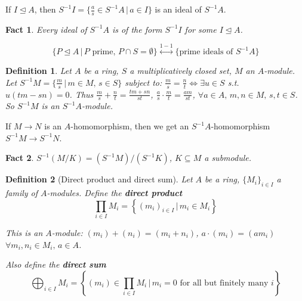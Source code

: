 \documentclass[a4paper]{article}
\newtheorem*{definition}{Definition}
\newtheorem*{fact}{Fact}
\begin{document}
If $I \trianglelefteq A$, then $S^{-1}I = \{\frac{a}{s}\in S^{-1}A \,|\, a \in I\}$ is an ideal of $S^{-1}A$.

\begin{fact}
	Every ideal of $S^{-1}A$ is of the form $S^{-1}I$ for some $I \trianglelefteq A$.
	
	$$\{P \trianglelefteq A \,|\, P \text{ prime, } P \cap S = \emptyset\} \overset{1-1}{\longleftrightarrow} \{\text{prime ideals of } S^{-1}A\}$$
\end{fact}

\begin{definition}
	Let $A$ be a ring, $S$ a multiplicatively closed set, $M$ an $A$-module. Let $S^{-1}M = \{\frac{m}{s} \,|\, m\in M,\, s\in S\}$ subject to: $\frac{m}{s}=\frac{n}{t} \iff \exists u \in S$ s.t. $u(tm-sn)=0$.
	Thus $\frac{m}{s}+\frac{n}{t}=\frac{tm+sn}{st}$, $\frac{a}{s}\cdot\frac{m}{t}=\frac{am}{st}$, $\forall a\in A ,\, m,n \in M,\, s,t \in S$. So $S^{-1}M$ is an $S^{-1}A$-module.
\end{definition}

If $M \to N$ is an $A$-homomorphism, then we get an $S^{-1}A$-homomorphism $S^{-1}M \to S^{-1}N$.

\begin{fact}
	$S^{-1}(M/K)=(S^{-1}M)/(S^{-1}K)$, $K\subseteq M$ a submodule.
\end{fact}

\begin{definition}[Direct product and direct sum]
	Let $A$ be a ring, $\{M_i\}_{i\in I}$ a family of $A$-modules. Define the \textbf{direct product} $$\prod_{i \in I}M_i = \left\{(m_i)_{i \in I} \,|\, m_i \in M_i\right\}$$
	
	This is an $A$-module: $(m_i)+(n_i) = (m_i+n_i)$, $a\cdot(m_i)=(am_i)$ $\forall m_i,n_i \in M_i ,\, a \in A$.
	
	Also define the \textbf{direct sum}
	$$\bigoplus_{i \in I} M_i = \left\{(m_i)\in \prod_{i \in I}M_i \,|\, m_i=0 \text{ for all but finitely many } i\right\}$$
\end{definition}
\end{document}
